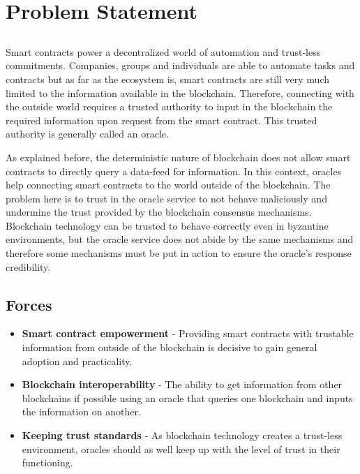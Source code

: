 \chapter{Problem Statement}\label{chap:chap4}

\section*{}


Smart contracts power a decentralized world of automation and trust-less commitments. Companies, groups and individuals are able to automate tasks and contracts but as far as the ecosystem is, smart contracts are still very much limited to the information available in the blockchain. Therefore, connecting with the outside world requires a trusted authority to input in the blockchain the required information upon request from the smart contract. This trusted authority is generally called an oracle.

As explained before, the deterministic nature of blockchain does not allow smart contracts to directly query a data-feed for information. In this context, oracles help connecting smart contracts to the world outside of the blockchain. The problem here is to trust in the oracle service to not behave maliciously and undermine the trust provided by the blockchain consensus mechanisms. Blockchain technology can be trusted to behave correctly even in byzantine environments, but the oracle service does not abide by the same mechanisms and therefore some mechanisms must be put in action to ensure the oracle's response credibility.



\section{Forces}
\begin{itemize}
    \item \textbf{Smart contract empowerment} - Providing smart contracts with trustable information from outside of the blockchain is decisive to gain general adoption and practicality.
    \item \textbf{Blockchain interoperability} - The ability to get information from other blockchains if possible using an oracle that queries one blockchain and inputs the information on another.
    \item \textbf{Keeping trust standards} - As blockchain technology creates a trust-less environment, oracles should as well keep up with the level of trust in their functioning.
\end{itemize} 

